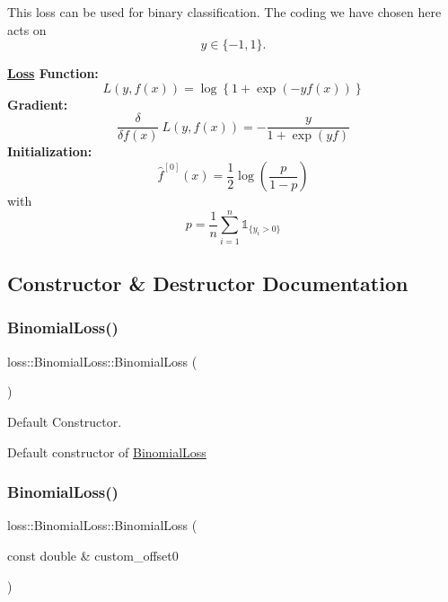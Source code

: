 This loss can be used for binary classification. The coding we have chosen here acts on \[ y \in \{-1, 1\}. \]

{\bfseries \mbox{\hyperlink{classloss_1_1_loss}{Loss}} Function\+:} \[ L(y, f(x)) = \log\left\{1 + \exp\left(-yf(x)\right)\right\} \] {\bfseries Gradient\+:} \[ \frac{\delta}{\delta f(x)}\ L(y, f(x)) = - \frac{y}{1 + \exp\left(yf\right)} \] {\bfseries Initialization\+:} \[ \hat{f}^{[0]}(x) = \frac{1}{2}\log\left(\frac{p}{1 - p}\right) \] with \[ p = \frac{1}{n}\sum\limits_{i=1}^n\mathbb{1}_{\{y_i > 0\}} \] 

\subsection{Constructor \& Destructor Documentation}
\mbox{\label{classloss_1_1_binomial_loss_ab903b1364d0569c83b4f44d8c7af0f69}} 
\subsubsection{\texorpdfstring{Binomial\+Loss()}{BinomialLoss()}\hspace{0.1cm}{\footnotesize\ttfamily [1/2]}}
{\footnotesize\ttfamily loss\+::\+Binomial\+Loss\+::\+Binomial\+Loss (\begin{DoxyParamCaption}{ }\end{DoxyParamCaption})}



Default Constructor. 

Default constructor of {\ttfamily \mbox{\hyperlink{classloss_1_1_binomial_loss}{Binomial\+Loss}}} \mbox{\label{classloss_1_1_binomial_loss_aac60ad4791933f54fb9858e8d89ba6a5}} 
\subsubsection{\texorpdfstring{Binomial\+Loss()}{BinomialLoss()}\hspace{0.1cm}{\footnotesize\ttfamily [2/2]}}
{\footnotesize\ttfamily loss\+::\+Binomial\+Loss\+::\+Binomial\+Loss (\begin{DoxyParamCaption}\item[{const double \&}]{custom\+\_\+offset0 }\end{DoxyParamCaption})}



